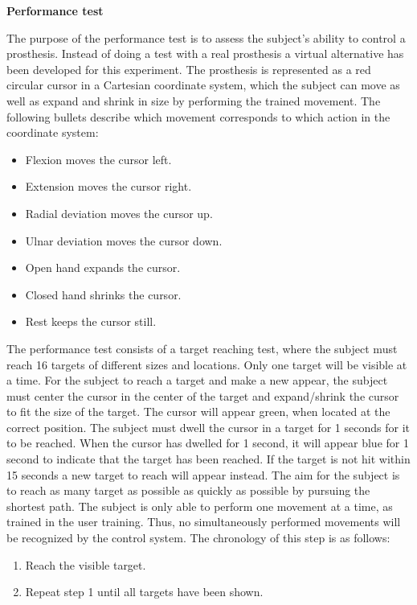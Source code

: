 \textbf{Performance test}

The purpose of the performance test is to assess the subject's ability to control a prosthesis. Instead of doing a test with a real prosthesis a virtual alternative has been developed for this experiment. The prosthesis is represented as a red circular cursor in a Cartesian coordinate system, which the subject can move as well as expand and shrink in size by performing the trained movement. The following bullets describe which movement corresponds to which action in the coordinate system:

\begin{itemize}
	\item Flexion moves the cursor left.
	\item Extension moves the cursor right.
	\item Radial deviation moves the cursor up.
	\item Ulnar deviation moves the cursor down.
	\item Open hand expands the cursor.
	\item Closed hand shrinks the cursor.
	\item Rest keeps the cursor still.
\end{itemize}

 The performance test consists of a target reaching test, where the subject must reach 16 targets of different sizes and locations. Only one target will be visible at a time. For the subject to reach a target and make a new appear, the subject must center the cursor in the center of the target and expand/shrink the cursor to fit the size of the target. The cursor will appear green, when located at the correct position. The subject must dwell the cursor in a target for 1 seconds for it to be reached. When the cursor has dwelled for 1 second, it will appear blue for 1 second to indicate that the target has been reached. If the target is not hit within 15 seconds a new target to reach will appear instead. The aim for the subject is to reach as many target as possible as quickly as possible by pursuing the shortest path. The subject is only able to perform one movement at a time, as trained in the user training. Thus, no simultaneously performed movements will be recognized by the control system. The chronology of this step is as follows:

\begin{enumerate}
	\item Reach the visible target.
	\item Repeat step 1 until all targets have been shown.
\end{enumerate}

